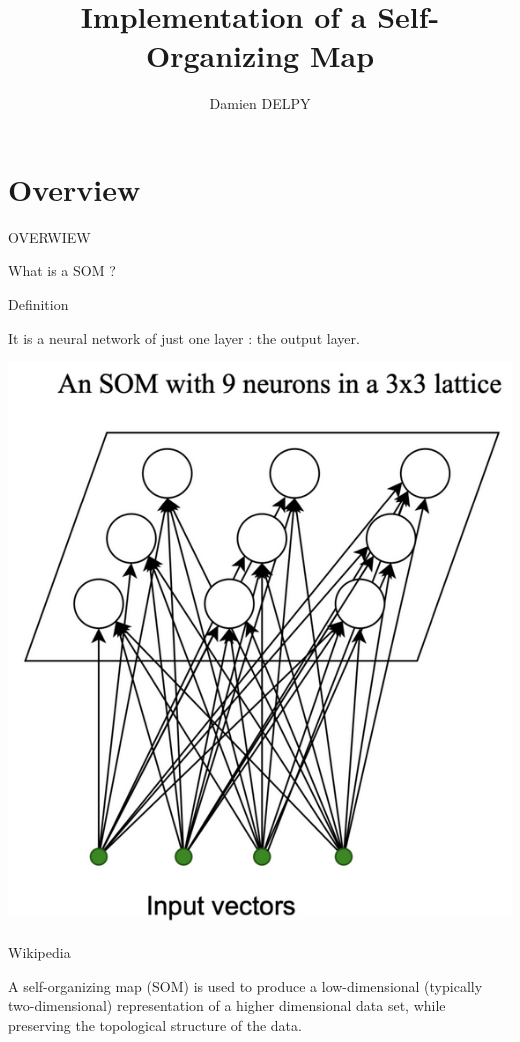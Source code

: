 \documentclass{beamer}
\author{Damien DELPY}
\title{Implementation of a Self-Organizing Map}
\institute{ENSEIRB-MATMECA}
\begin{document}
\begin{frame}
	
	\titlepage
\end{frame}


\begin{frame}

	\tableofcontents[sectionstyle=show,subsectionstyle=show/shaded/hide,subsectionstyle=show/shaded/hide]
\end{frame}



\section{Overview}
	
	\begin{frame}

		\begin{center}
			
			\Huge OVERWIEW
		\end{center}
	\end{frame}


	\begin{frame}{What is a SOM ?}
		
		\begin{block}{Definition}
 
It is a neural network of just one layer : the output layer.
 	
			
		\begin{center}
			\includegraphics[width=0.3\linewidth]{pics/som_example_diapo_1.png}
		\end{center}

		\end{block}		

		\begin{block}{Wikipedia}

A self-organizing map (SOM) is used to produce a low-dimensional (typically two-dimensional) representation of a higher dimensional data set, while preserving the topological structure of the data. 
		\end{block}
	\end{frame}
	
\end{document}
